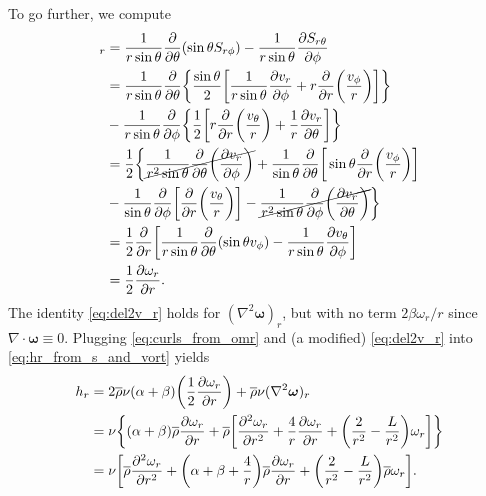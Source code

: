 \documentclass[12pt]{article} %
\newcommand{\pderiv}[2]{\frac{\partial#1}{\partial#2}}
\newcommand{\ppderiv}[2]{\frac{\partial^2#1}{\partial#2^2}}
\newcommand{\e}{\hat{\bm{e}}}
\newcommand{\rhobar}{\overline{\rho}}
\newcommand{\curl}{\nabla\times}
\begin{document}
	To go further, we compute
	\begin{align}
	[\curl(S_{r\gamma}\e_\gamma)]_r &= \frac{1}{r\sin\theta}\pderiv{}{\theta}(\sin\theta S_{r\phi}) - \frac{1}{r\sin\theta}\pderiv{S_{r\theta}}{\phi}\nonumber\\
	&= \frac{1}{r\sin\theta}\pderiv{}{\theta}\bigg{\{}\frac{\sin\theta}{2}\bigg{[}\frac{1}{r\sin\theta}\pderiv{v_r}{\phi} + r\pderiv{}{r}\bigg{(}\frac{v_\phi}{r}\bigg{)}\bigg{]}\bigg{\}}\nonumber\\
	&- \frac{1}{r\sin\theta}\pderiv{}{\phi}\bigg{\{}\frac{1}{2}\bigg{[}r\pderiv{}{r}\bigg{(}\frac{v_\theta}{r}\bigg{)}+\frac{1}{r}\pderiv{v_r}{\theta}\bigg{]}\bigg{\}}\nonumber\\
	&= \frac{1}{2}\bigg{\{}\cancel{\frac{1}{r^2\sin\theta}\pderiv{}{\theta}\bigg{(}\pderiv{v_r}{\phi}\bigg{)}} + \frac{1}{\sin\theta}\pderiv{}{\theta}\bigg{[}\sin\theta\pderiv{}{r}\bigg{(}\frac{v_\phi}{r}\bigg{)}\bigg{]} \nonumber\\ &-\frac{1}{\sin\theta}\pderiv{}{\phi}\bigg{[}\pderiv{}{r}\bigg{(}\frac{v_\theta}{r}\bigg{)}\bigg{]} - \cancel{\frac{1}{r^2\sin\theta}\pderiv{}{\phi}\bigg{(}\pderiv{v_r}{\theta}\bigg{)}}\bigg{\}}\nonumber\\
	&= \frac{1}{2}\pderiv{}{r}\bigg{[}\frac{1}{r\sin\theta}\pderiv{}{\theta}(\sin\theta v_\phi) - \frac{1}{r\sin\theta}\pderiv{v_\theta}{\phi}\bigg{]}\\
	&= \frac{1}{2}\pderiv{\omega_r}{r}.
	\label{eq:curls_from_omr}
	\end{align}
	The identity \eqref{eq:del2v_r} holds for $(\nabla^2\bm{\omega})_r$, but with no term $2\beta\omega_r/r$ since $\nabla\cdot\bm{\omega}\equiv 0$. Plugging \eqref{eq:curls_from_omr} and (a modified) \eqref{eq:del2v_r} into \eqref{eq:hr_from_s_and_vort} yields
	\begin{align}
	h_r &= 2\rhobar\nu(\alpha+\beta)\bigg{(}\frac{1}{2}\pderiv{\omega_r}{r}\bigg{)} + \rhobar\nu(\nabla^2\bm{\omega})_r\\
	&= \nu\bigg{\{}(\alpha+\beta)\rhobar\pderiv{\omega_r}{r} + \rhobar\bigg{[}\ppderiv{\omega_r}{r} + \frac{4}{r}\pderiv{\omega_r}{r} + \bigg{(}\frac{2}{r^2} - \frac{L}{r^2}\bigg{)}\omega_r\bigg{]}\bigg{\}}\nonumber\\
	&= \nu\bigg{[}\rhobar\ppderiv{\omega_r}{r} +\bigg{(}\alpha+\beta+\frac{4}{r}\bigg{)}\rhobar\pderiv{\omega_r}{r} + \bigg{(}\frac{2}{r^2}-\frac{L}{r^2}\bigg{)}\rhobar\omega_r\bigg{]}.
	\label{eq:hr_from_vort}
	\end{align}
	
\end{document}
